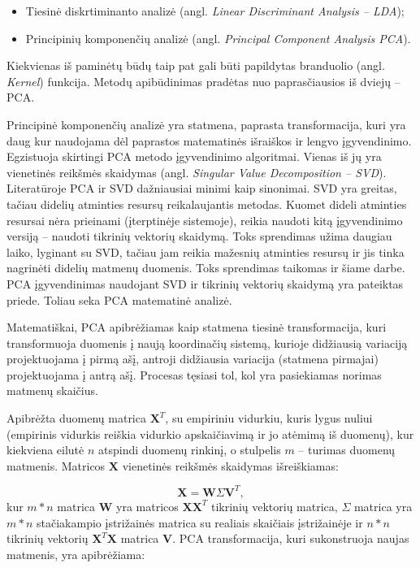 \documentclass[]{vgtuef}
\begin{document}
\begin{itemize}
\item Tiesinė diskrtiminanto analizė (angl. \textit{Linear Discriminant Analysis -- LDA});
\item Principinių komponenčių analizė (angl. \textit{Principal Component Analysis PCA}).
\end{itemize}

Kiekvienas iš paminėtų būdų taip pat gali būti papildytas branduolio (angl. \textit{Kernel}) funkcija. Metodų apibūdinimas pradėtas nuo paprasčiausios iš dviejų -- PCA.

Principinė komponenčių analizė \cite{citeulike:2695782} yra statmena, paprasta transformacija, kuri yra daug kur naudojama dėl paprastos matematinės išraiškos ir lengvo įgyvendinimo. Egzistuoja skirtingi PCA metodo įgyvendinimo algoritmai. Vienas iš jų yra vienetinės reikšmės skaidymas (angl. \textit{Singular Value Decomposition -- SVD}). Literatūroje PCA ir SVD dažniausiai minimi kaip sinonimai. SVD yra greitas, tačiau didelių atminties resursų reikalaujantis metodas. Kuomet dideli atminties resursai nėra prieinami (įterptinėje sistemoje), reikia naudoti kitą įgyvendinimo versiją -- naudoti tikrinių vektorių skaidymą. Toks sprendimas užima daugiau laiko, lyginant su SVD, tačiau jam reikia mažesnių atminties resursų ir jis tinka nagrinėti didelių matmenų duomenis. Toks sprendimas taikomas ir šiame darbe. PCA įgyvendinimas naudojant SVD ir tikrinių vektorių skaidymą yra pateiktas priede. Toliau seka PCA matematinė analizė.

Matematiškai, PCA apibrėžiamas kaip statmena tiesinė transformacija, kuri transformuoja duomenis į naują koordinačių sistemą, kurioje didžiausią variaciją projektuojama į pirmą ašį, antroji didžiausia variacija (statmena pirmajai) projektuojama į antrą ašį. Procesas tęsiasi tol, kol yra pasiekiamas norimas matmenų skaičius.

Apibrėžta duomenų matrica $\textbf{X}^T$, su empiriniu vidurkiu, kuris lygus nuliui (empirinis vidurkis reiškia vidurkio apskaičiavimą ir jo atėmimą iš duomenų), kur kiekviena eilutė $n$ atspindi duomenų rinkinį, o stulpelis $m$ -- turimas duomenų matmenis. Matricos $\textbf{X}$ vienetinės reikšmės skaidymas išreiškiamas:

\begin{equation}
  \mathbf{X} = \mathbf{W} \Sigma \mathbf{V}^T,
\end{equation}
kur $m*n$ matrica $\mathbf{W}$ yra matricos $\textbf{XX}^T$ tikrinių vektorių matrica, $\Sigma$ matrica yra $m*n$ stačiakampio įstrižainės matrica su realiais skaičiais įstrižainėje ir $n*n$ tikrinių vektorių $\mathbf{X}^T\mathbf{X}$ matrica $\mathbf{V}$. PCA transformacija, kuri sukonstruoja naujas matmenis, yra apibrėžiama:
\end{document}
